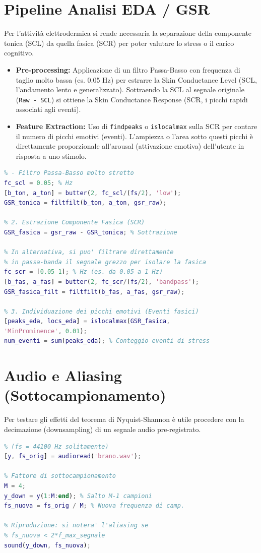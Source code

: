 \section{Pipeline Analisi EDA / GSR}
Per l'attività elettrodermica si rende necessaria la separazione della componente tonica (SCL) da quella fasica (SCR) per poter valutare lo stress o il carico cognitivo.

\begin{itemize}
    \item \textbf{Pre-processing:} Applicazione di un filtro Passa-Basso con frequenza di taglio molto bassa (es.
    0.05 Hz) per estrarre la Skin Conductance Level (SCL, l'andamento lento e generalizzato).
    Sottraendo la SCL al segnale originale (\texttt{Raw - SCL}) si ottiene la Skin Conductance Response (SCR, i picchi rapidi associati agli eventi).
    \item \textbf{Feature Extraction:} Uso di \texttt{findpeaks} o \texttt{islocalmax} sulla SCR per contare il numero di picchi emotivi (eventi).
    L'ampiezza o l'area sotto questi picchi è direttamente proporzionale all'arousal (attivazione emotiva) dell'utente in risposta a uno stimolo.
\end{itemize}

\begin{lstlisting}[language=Matlab, frame=single, commentstyle=\color{green!50!black}, keywordstyle=\color{blue}]
% 1. Estrazione Componente Tonica (SCL)
% - Filtro Passa-Basso molto stretto
fc_scl = 0.05; % Hz
[b_ton, a_ton] = butter(2, fc_scl/(fs/2), 'low');
GSR_tonica = filtfilt(b_ton, a_ton, gsr_raw);

% 2. Estrazione Componente Fasica (SCR)
GSR_fasica = gsr_raw - GSR_tonica; % Sottrazione

% In alternativa, si puo' filtrare direttamente
% in passa-banda il segnale grezzo per isolare la fasica
fc_scr = [0.05 1]; % Hz (es. da 0.05 a 1 Hz)
[b_fas, a_fas] = butter(2, fc_scr/(fs/2), 'bandpass');
GSR_fasica_filt = filtfilt(b_fas, a_fas, gsr_raw);

% 3. Individuazione dei picchi emotivi (Eventi fasici)
[peaks_eda, locs_eda] = islocalmax(GSR_fasica,
'MinProminence', 0.01);
num_eventi = sum(peaks_eda); % Conteggio eventi di stress
\end{lstlisting}

\section{Audio e Aliasing (Sottocampionamento)}
Per testare gli effetti del teorema di Nyquist-Shannon è utile procedere con la decimazione (downsampling) di un segnale audio pre-registrato.
\begin{lstlisting}[language=Matlab, frame=single, commentstyle=\color{green!50!black}, keywordstyle=\color{blue}]
% Caricamento audio originale
% (fs = 44100 Hz solitamente)
[y, fs_orig] = audioread('brano.wav');

% Fattore di sottocampionamento
M = 4;
y_down = y(1:M:end); % Salto M-1 campioni
fs_nuova = fs_orig / M; % Nuova frequenza di camp.

% Riproduzione: si notera' l'aliasing se
% fs_nuova < 2*f_max_segnale
sound(y_down, fs_nuova);
\end{lstlisting}

